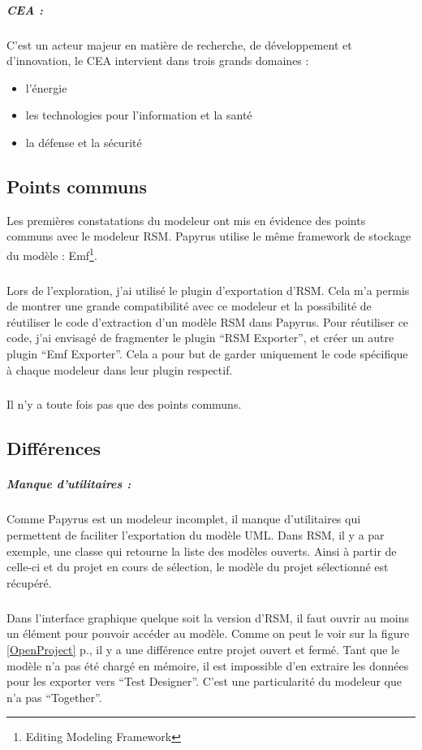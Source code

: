 \subparagraph{CEA :}
C'est un acteur majeur en matière de recherche, de développement et d’innovation, le CEA intervient dans trois grands domaines :
\begin{itemize}
  \item  l’énergie
  \item les technologies pour l’information et la santé
  \item la défense et la sécurité
\end{itemize}

\subsection{Points communs}

Les premières constatations du modeleur ont mis en évidence des points communs avec le modeleur RSM.
Papyrus utilise le même framework de stockage du modèle : Emf\footnote{Editing Modeling Framework}.

\subparagraph*{}
Lors de l'exploration, j'ai utilisé le plugin d'exportation d'RSM.
Cela m'a permis de montrer une grande compatibilité avec ce modeleur et la possibilité de réutiliser le code d'extraction d'un modèle RSM dans Papyrus.
Pour réutiliser ce code, j'ai envisagé de fragmenter le plugin ``RSM Exporter'', et créer un autre plugin ``Emf Exporter''.
Cela a pour but de garder uniquement le code spécifique à chaque modeleur dans leur plugin respectif.

\subparagraph*{}
Il n'y a toute fois pas que des points communs.

\subsection{Différences}

\subparagraph{Manque d'utilitaires :}
Comme Papyrus est un modeleur incomplet, il manque d'utilitaires qui permettent de faciliter l'exportation du modèle UML.
Dans RSM, il y a par exemple, une classe qui retourne la liste des modèles ouverts.
Ainsi à partir de celle-ci et du projet en cours de sélection, le modèle du projet sélectionné est récupéré.

\subparagraph*{}
Dans l'interface graphique quelque soit la version d'RSM, il faut ouvrir au moins un élément pour pouvoir accéder au modèle.
Comme on peut le voir sur la figure \ref{OpenProject} p.\pageref{OpenProject}, il y a une différence entre projet ouvert et fermé. 
Tant que le modèle n'a pas été chargé en mémoire, il est impossible d'en extraire les données pour les exporter vers ``Test Designer''. C'est une particularité du modeleur que n'a pas ``Together''.

